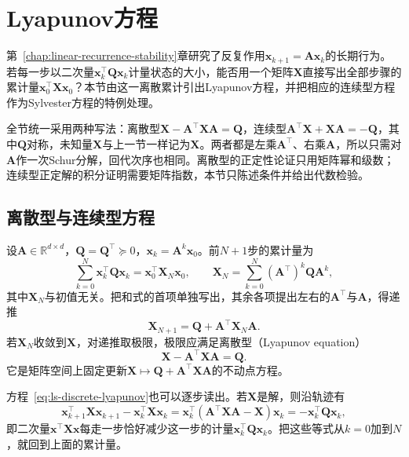 
\section{Lyapunov方程}
\label{sec:ls-lyapunov}

第~\ref{chap:linear-recurrence-stability}章研究了反复作用$\bm x_{k+1}=\bm A\bm x_k$的长期行为。若每一步以二次量$\bm x_k^\top\bm Q\bm x_k$计量状态的大小，能否用一个矩阵$\bm X$直接写出全部步骤的累计量$\bm x_0^\top\bm X\bm x_0$？本节由这一离散累计引出Lyapunov方程，并把相应的连续型方程作为Sylvester方程的特例处理。

全节统一采用两种写法：离散型$\bm X-\bm A^\top\bm X\bm A=\bm Q$，连续型$\bm A^\top\bm X+\bm X\bm A=-\bm Q$，其中$\bm Q$对称，未知量$\bm X$与上一节一样记为$\bm X$。两者都是左乘$\bm A^\top$、右乘$\bm A$，所以只需对$\bm A$作一次Schur分解，回代次序也相同。离散型的正定性论证只用矩阵幂和级数；连续型正定解的积分证明需要矩阵指数，本节只陈述条件并给出代数检验。

\subsection{离散型与连续型方程}
\label{sec:ls-lyapunov-solvability}

设$\bm A\in\mathbb R^{d\times d}$，$\bm Q=\bm Q^\top\succeq0$，$\bm x_k=\bm A^k\bm x_0$。前$N+1$步的累计量为
\begin{equation}
 \sum_{k=0}^{N}\bm x_k^\top\bm Q\bm x_k=\bm x_0^\top\bm X_N\bm x_0,\qquad
 \bm X_N=\sum_{k=0}^{N}(\bm A^\top)^k\bm Q\bm A^k ,
 \label{eq:ls-discrete-lyapunov-partial-sum}
\end{equation}
其中$\bm X_N$与初值无关。把和式的首项单独写出，其余各项提出左右的$\bm A^\top$与$\bm A$，得递推
\[
 \bm X_{N+1}=\bm Q+\bm A^\top\bm X_N\bm A .
\]
若$\bm X_N$收敛到$\bm X$，对递推取极限，极限应满足离散型（Lyapunov equation）
\begin{equation}
 \bm X-\bm A^\top\bm X\bm A=\bm Q .
 \label{eq:ls-discrete-lyapunov}
\end{equation}
它是矩阵空间上固定更新$\bm X\mapsto\bm Q+\bm A^\top\bm X\bm A$的不动点方程。

方程~\eqref{eq:ls-discrete-lyapunov}也可以逐步读出。若$\bm X$是解，则沿轨迹有
\begin{equation}
 \bm x_{k+1}^\top\bm X\bm x_{k+1}-\bm x_k^\top\bm X\bm x_k
 =\bm x_k^\top(\bm A^\top\bm X\bm A-\bm X)\bm x_k
 =-\bm x_k^\top\bm Q\bm x_k ,
 \label{eq:ls-discrete-lyapunov-decrement}
\end{equation}
即二次量$\bm x^\top\bm X\bm x$每走一步恰好减少这一步的计量$\bm x_k^\top\bm Q\bm x_k$。把这些等式从$k=0$加到$N$，就回到上面的累计量。

